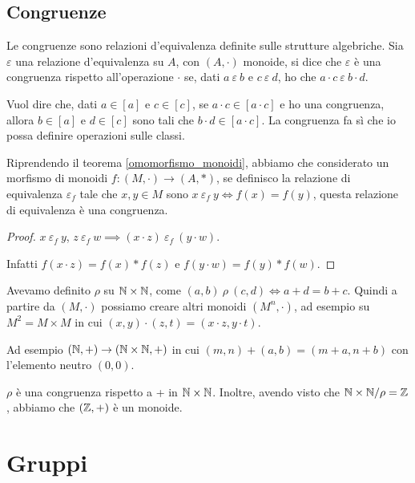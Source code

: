 \subsection{Congruenze\label{congruenze}}

\begin{defn}
Le congruenze sono relazioni d'equivalenza definite sulle strutture algebriche. Sia $\varepsilon$ una relazione d'equivalenza su $A$, con $(A, \cdot)$ monoide, si dice che $\varepsilon$ \`e una congruenza rispetto all'operazione $\cdot$ se, dati $a \ \varepsilon \ b$ e $c \ \varepsilon \ d$, ho che $a \cdot c \ \varepsilon \ b \cdot d$.
\end{defn}

Vuol dire che, dati $a \in [a]$ e $c \in [c]$, se $a \cdot c \in [a \cdot c]$ e ho una congruenza, allora $b \in [a]$ e $d \in [c]$ sono tali che $b \cdot d \in [a \cdot c]$. La congruenza fa s\`i che io possa definire operazioni sulle classi.

\begin{prop}
Riprendendo il teorema \ref{omomorfismo_monoidi}, abbiamo che considerato un morfismo di monoidi $f : (M, \cdot) \to (A, \ast)$, se definisco la relazione di equivalenza $\varepsilon_f$ tale che $x, y \in M$ sono $x \ \varepsilon_f \ y \iff f(x) = f(y)$, questa relazione di equivalenza \`e una congruenza.
\end{prop}
\begin{proof}\label{congruenza_monoidi}
$x \ \varepsilon_f \ y$, $z \ \varepsilon_f \ w \implies (x \cdot z) \ \varepsilon_f \ (y \cdot w)$.

Infatti $f(x \cdot z) = f(x) \ast f(z)$ e $f(y \cdot w) = f(y) \ast f(w)$. 
\end{proof}

Avevamo definito $\rho$ su $\mathbb{N} \times \mathbb{N}$, come $(a, b) \ \rho \ (c, d) \iff a+d = b+c$. Quindi a partire da $(M, \cdot) $ possiamo creare altri monoidi $(M^n, \cdot)$, ad esempio su $M^2 = M \times M$ in cui $(x, y) \cdot (z, t) = (x \cdot z, y \cdot t)$.

Ad esempio $(\mathbb{N}, +) \to (\mathbb{N} \times \mathbb{N}, +)$ in cui $(m, n) + (a, b) = (m+a, n+b)$ con l'elemento neutro $(0,0)$.

$\rho$ \`e una congruenza rispetto a + in $\mathbb{N} \times \mathbb{N}$. Inoltre, avendo visto che $\mathbb{N} \times \mathbb{N} / \rho = \mathbb{Z}$, abbiamo che $(\mathbb{Z}, +)$ \`e un monoide.


\section{Gruppi}

